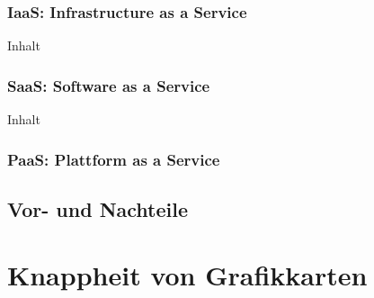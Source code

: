 \documentclass[12pt,toc=bib,toc=listof]{scrreprt}
\begin{document}

\subsection{IaaS: Infrastructure as a Service}
\label{sec:IaaS: Infrastructure as a Service}

Inhalt

\subsection{SaaS: Software as a Service}
\label{sec:SaaS: Software as a Service}

Inhalt

\subsection{PaaS: Plattform as a Service}
\label{sec:PaaS: Plattform as a Service}


\section{Vor- und Nachteile}
\label{Vor- und Nachteile}

\chapter{Knappheit von Grafikkarten} %
\label{sec:Knappheit von Grafikkarten}
\end{document}
